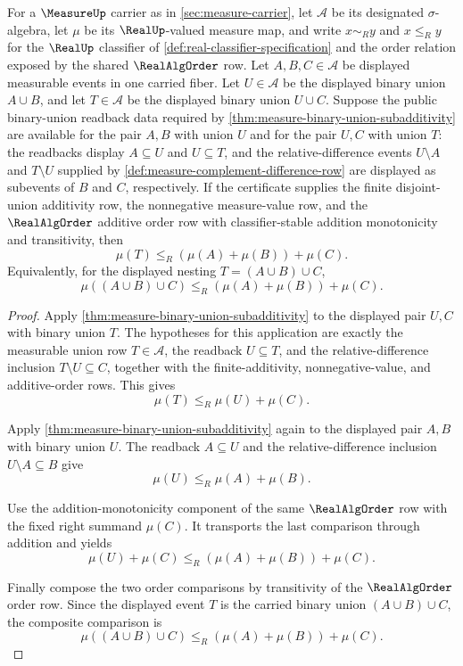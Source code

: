 \begin{theorem}
\label{thm:measure-triple-union-subadditivity}
For a $\MeasureUp$ carrier as in \autoref{sec:measure-carrier}, let
$\mathcal{A}$ be its designated $\sigma$-algebra, let $\mu$ be its
$\RealUp$-valued measure map, and write $x\sim_R y$ and $x\le_R y$ for the
$\RealUp$ classifier of \autoref{def:real-classifier-specification} and the
order relation exposed by the shared $\RealAlgOrder$ row. Let
$A,B,C\in\mathcal{A}$ be displayed measurable events in one carried fiber.
Let $U\in\mathcal{A}$ be the displayed binary union $A\cup B$, and let
$T\in\mathcal{A}$ be the displayed binary union $U\cup C$. Suppose the public
binary-union readback data required by
\autoref{thm:measure-binary-union-subadditivity} are available for the pair
$A,B$ with union $U$ and for the pair $U,C$ with union $T$: the readbacks
display $A\subseteq U$ and $U\subseteq T$, and the relative-difference events
$U\setminus A$ and $T\setminus U$ supplied by
\autoref{def:measure-complement-difference-row} are displayed as subevents of
$B$ and $C$, respectively. If the certificate supplies the finite
disjoint-union additivity row, the nonnegative measure-value row, and the
$\RealAlgOrder$ additive order row with classifier-stable addition
monotonicity and transitivity, then
$$
\mu(T)\le_R(\mu(A)+\mu(B))+\mu(C).
$$
Equivalently, for the displayed nesting $T=(A\cup B)\cup C$,
$$
\mu((A\cup B)\cup C)\le_R(\mu(A)+\mu(B))+\mu(C).
$$
\end{theorem}
\begin{proof}
Apply \autoref{thm:measure-binary-union-subadditivity} to the displayed pair
$U,C$ with binary union $T$. The hypotheses for this application are exactly
the measurable union row $T\in\mathcal{A}$, the readback $U\subseteq T$, and
the relative-difference inclusion $T\setminus U\subseteq C$, together with the
finite-additivity, nonnegative-value, and additive-order rows. This gives
$$
\mu(T)\le_R\mu(U)+\mu(C).
$$

Apply \autoref{thm:measure-binary-union-subadditivity} again to the displayed
pair $A,B$ with binary union $U$. The readback $A\subseteq U$ and the
relative-difference inclusion $U\setminus A\subseteq B$ give
$$
\mu(U)\le_R\mu(A)+\mu(B).
$$

Use the addition-monotonicity component of the same $\RealAlgOrder$ row with
the fixed right summand $\mu(C)$. It transports the last comparison through
addition and yields
$$
\mu(U)+\mu(C)\le_R(\mu(A)+\mu(B))+\mu(C).
$$

Finally compose the two order comparisons by transitivity of the
$\RealAlgOrder$ order row. Since the displayed event $T$ is the carried binary
union $(A\cup B)\cup C$, the composite comparison is
$$
\mu((A\cup B)\cup C)\le_R(\mu(A)+\mu(B))+\mu(C).
$$
\end{proof}

